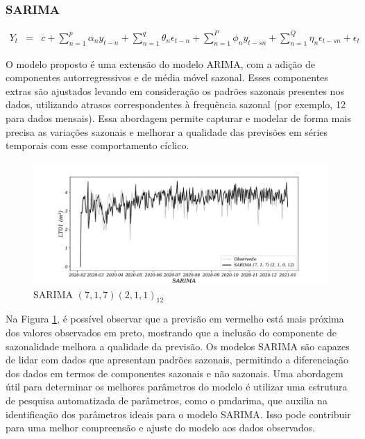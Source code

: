 \subsubsection{SARIMA}

\begin{eqnarray}
	Y_t&=&c+\sum_{n=1}^p \alpha_n y_{t-n}+\sum_{n=1}^q \theta_n \epsilon_{t-n}+\sum_{n=1}^P \phi_n y_{t-s n}+\sum_{n=1}^Q \eta_n \epsilon_{t-s n}+\epsilon_t \label{sarima}
\end{eqnarray}

O modelo proposto é uma extensão do modelo ARIMA, com a adição de componentes autorregressivos e de média móvel sazonal. Esses componentes extras são ajustados levando em consideração os padrões sazonais presentes nos dados, utilizando atrasos correspondentes à frequência sazonal (por exemplo, 12 para dados mensais). Essa abordagem permite capturar e modelar de forma mais precisa as variações sazonais e melhorar a qualidade das previsões em séries temporais com esse comportamento cíclico.

\begin{figure}[H]
	\centering
	\caption{SARIMA $(7,1,7) (2,1,1)_{12}$}
	\label{fig:1-sarima}
	\includegraphics[width=0.9\linewidth]{Modelos/Figuras/0-SARIMA}
	
\end{figure}

Na Figura \ref{fig:1-sarima}, é possível observar que a previsão em vermelho está mais próxima dos valores observados em preto, mostrando que a inclusão do componente de sazonalidade melhora a qualidade da previsão. Os modelos SARIMA são capazes de lidar com dados que apresentam padrões sazonais, permitindo a diferenciação dos dados em termos de componentes sazonais e não sazonais. Uma abordagem útil para determinar os melhores parâmetros do modelo é utilizar uma estrutura de pesquisa automatizada de parâmetros, como o pmdarima, que auxilia na identificação dos parâmetros ideais para o modelo SARIMA. Isso pode contribuir para uma melhor compreensão e ajuste do modelo aos dados observados.

